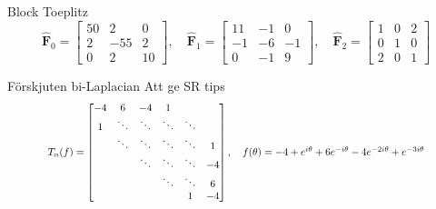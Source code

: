 \documentclass{beamer}
\begin{document}
\begin{frame}{Block Toeplitz}
    \begin{equation}
    \hat{\mathbf{F}}_0=\begin{bmatrix}
    50 & 2 & 0 \\ 2 &-55 & 2 \\ 0 & 2 & 10
    \end{bmatrix}, \quad
    \hat{\mathbf{F}}_1 = \begin{bmatrix}
        11 & -1 & 0 \\ -1 & -6 & -1 \\ 0 & -1 &9
    \end{bmatrix}, \quad
    \hat{\mathbf{F}}_2 = \begin{bmatrix}
    1 & 0 & 2 \\ 0 & 1 & 0 \\2 & 0 & 1
    \end{bmatrix}
    \label{block-matrix entries}
\end{equation}
\end{frame}
\begin{frame}{Förskjuten bi-Laplacian}
Att ge SR tips
\begin{equation*}
    \scalebox{0.8}{$T_n(f)=
    \begin{bmatrix}
    -4 & 6 & -4 & 1&&\\
    1&\ddots &\ddots & \ddots&\ddots  &\\
    & \ddots&\ddots & \ddots&\ddots &1\\
    &  & \ddots &\ddots&\ddots &-4\\
    &  &  &\ddots  &\ddots&6\\
    & & & & 1&-4
    \end{bmatrix}, \quad f(\theta) = -4 + e^{i\theta} + 6e^{-i\theta} -4e^{-2i\theta} + e^{-3i\theta}$}
\label{mat[-4,1][-4,6,-4,1]}
\end{equation*}
    
\end{frame}
\end{document}
